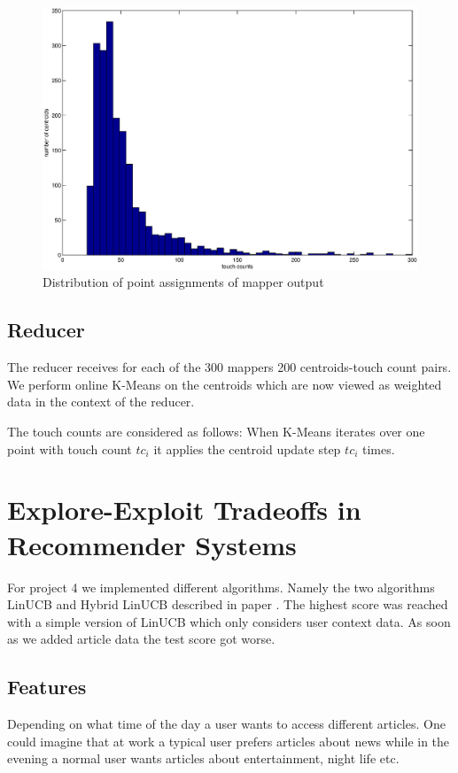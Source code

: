 \documentclass[a4paper, 11pt]{article}
\begin{document}
\begin{figure}[H]
\centering
\includegraphics[scale=0.35]{histogram.eps}
\caption{Distribution of point assignments of mapper output}
\label{fig:proj3-initialisation}
\end{figure}


\subsection{Reducer}
The reducer receives for each of the 300 mappers 200 centroids-touch count pairs. We perform online K-Means on the centroids which are now viewed as weighted data in the context of the reducer.

The touch counts are considered as follows: When K-Means iterates over one point with touch count $tc_i$ it applies the centroid update step $tc_i$ times.

\section{Explore-Exploit Tradeoffs in Recommender Systems}

For project 4 we implemented different algorithms. Namely the two algorithms LinUCB and Hybrid LinUCB described in paper \cite{li2010contextual}. The highest score was reached with a simple version of LinUCB which only considers user context data. As soon as we added article data the test score got worse.

\subsection{Features}
Depending on what time of the day a user wants to access different articles. One could imagine that at work a typical user prefers articles about news while in the evening a normal user wants articles about entertainment, night life etc.
\end{document}
